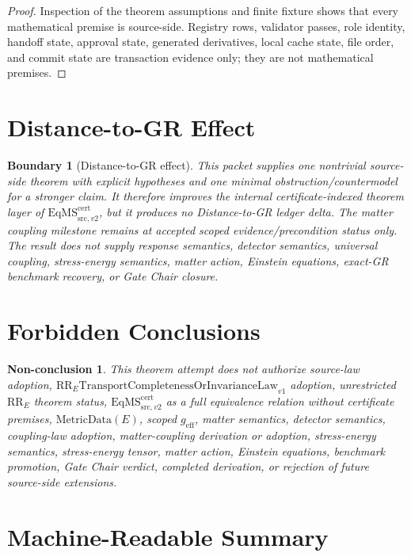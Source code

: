 \documentclass[11pt]{article}
\newcommand{\EqMSTwo}{\mathrm{EqMS}^{\mathrm{cert}}_{\mathrm{src},v2}}
\newcommand{\MetricData}{\mathrm{MetricData}}
\newcommand{\geff}{g_{\mathrm{eff}}}
\newcommand{\RRE}{\mathrm{RR}_{E}}
\newcommand{\RRELaw}{\mathrm{RR}_{E}\mathrm{TransportCompletenessOrInvarianceLaw}_{v1}}
\newtheorem{boundary}{Boundary}
\newtheorem{nonconclusion}{Non-conclusion}
\begin{document}
\begin{proof}
Inspection of the theorem assumptions and finite fixture shows that every
mathematical premise is source-side. Registry rows, validator passes, role
identity, handoff state, approval state, generated derivatives, local cache
state, file order, and commit state are transaction evidence only; they are
not mathematical premises.
\end{proof}

\section{Distance-to-GR Effect}

\begin{boundary}[Distance-to-GR effect]
This packet supplies one nontrivial source-side theorem with explicit
hypotheses and one minimal obstruction/countermodel for a stronger claim. It
therefore improves the internal certificate-indexed theorem layer of
\(\EqMSTwo\), but it produces no Distance-to-GR ledger delta. The matter
coupling milestone remains at accepted scoped evidence/precondition status
only. The result does not supply response semantics, detector semantics,
universal coupling, stress-energy semantics, matter action, Einstein
equations, exact-GR benchmark recovery, or Gate Chair closure.
\end{boundary}

\section{Forbidden Conclusions}

\begin{nonconclusion}
This theorem attempt does not authorize source-law adoption,
\(\RRELaw\) adoption, unrestricted \(\RRE\) theorem status,
\(\EqMSTwo\) as a full equivalence relation without certificate premises,
\(\MetricData(E)\), scoped \(\geff\), matter semantics, detector semantics,
coupling-law adoption, matter-coupling derivation or adoption, stress-energy
semantics, stress-energy tensor, matter action, Einstein equations, benchmark
promotion, Gate Chair verdict, completed derivation, or rejection of future
source-side extensions.
\end{nonconclusion}

\section{Machine-Readable Summary}
\end{document}
